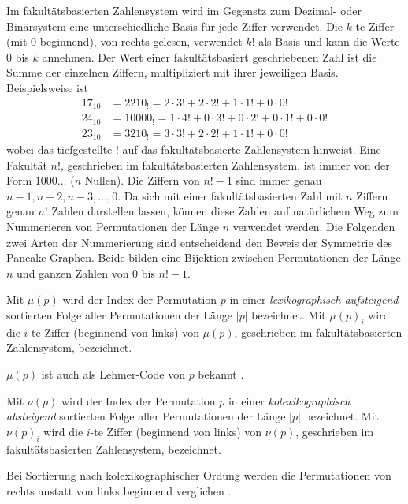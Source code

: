 \documentclass[a4paper, 10pt, ngerman]{article}
\begin{document}
Im fakultätsbasierten Zahlensystem wird im Gegenstz zum Dezimal- oder Binärsystem eine unterschiedliche Basis für jede Ziffer verwendet. Die $k$-te Ziffer (mit 0 beginnend), von rechts gelesen, verwendet $k!$ als Basis und kann die Werte 0 bis $k$ annehmen. Der Wert einer fakultätsbasiert geschriebenen Zahl ist die Summe der einzelnen Ziffern, multipliziert mit ihrer jeweiligen Basis. Beispielsweise ist
\begin{align*}
    17_{10} & = 2210_!   = 2 \cdot 3! + 2 \cdot 2! + 1 \cdot 1! + 0 \cdot 0!             \\
    24_{10} & = 10000_! = 1 \cdot 4! + 0 \cdot 3! + 0 \cdot 2! + 0 \cdot 1! + 0 \cdot 0! \\
    23_{10} & = 3210_!  = 3 \cdot 3! + 2 \cdot 2! + 1 \cdot 1! + 0 \cdot 0!
\end{align*}
wobei das tiefgestellte ! auf das fakultätsbasierte Zahlensystem hinweist. Eine Fakultät $n!$, geschrieben im fakultätsbasierten Zahlensystem, ist immer von der Form $1000\dots$ ($n$ Nullen). Die Ziffern von $n! - 1$ sind immer genau $n-1, n-2, n-3, \dots, 0$.
Da sich mit einer fakultätsbasierten Zahl mit $n$ Ziffern genau $n!$ Zahlen darstellen lassen, können diese Zahlen auf natürlichem Weg zum Nummerieren von Permutationen der Länge $n$ verwendet werden. Die Folgenden zwei Arten der Nummerierung sind entscheidend den Beweis der Symmetrie des Pancake-Graphen. Beide bilden eine Bijektion zwischen Permutationen der Länge $n$ und ganzen Zahlen von 0 bis $n! - 1$.

\begin{definition}
    Mit $\mu(p)$ wird der Index der Permutation $p$ in einer \emph{lexikographisch aufsteigend} sortierten Folge aller Permutationen der Länge $|p|$ bezeichnet. Mit $\mu(p)_i$ wird die $i$-te Ziffer (beginnend von links) von $\mu(p)$, geschrieben im fakultätsbasierten Zahlensystem, bezeichnet.
\end{definition}

$\mu(p)$ ist auch als Lehmer-Code von $p$ bekannt \cite{factorial}.

\begin{definition}
    Mit $\nu(p)$ wird der Index der Permutation $p$ in einer \emph{kolexikographisch absteigend} sortierten Folge aller Permutationen der Länge $|p|$ bezeichnet. Mit $\nu(p)_i$ wird die $i$-te Ziffer (beginnend von links) von $\nu(p)$, geschrieben im fakultätsbasierten Zahlensystem, bezeichnet.
\end{definition}

Bei Sortierung nach kolexikographischer Ordung werden die Permutationen von rechts anstatt von links beginnend verglichen \cite{lexicographic}.
\end{document}
